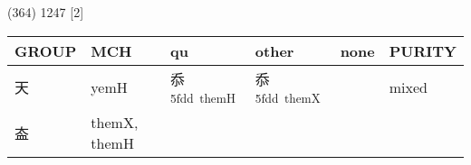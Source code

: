 \documentclass[14pt,a4paper]{scrartcl}
\begin{document}
(364) 1247 {[}2{]}

\begin{longtable}[c]{@{}llllll@{}}
\toprule
\begin{minipage}[b]{0.14\columnwidth}\raggedright\strut
GROUP
\strut\end{minipage} &
\begin{minipage}[b]{0.14\columnwidth}\raggedright\strut
MCH
\strut\end{minipage} &
\begin{minipage}[b]{0.14\columnwidth}\raggedright\strut
qu
\strut\end{minipage} &
\begin{minipage}[b]{0.14\columnwidth}\raggedright\strut
other
\strut\end{minipage} &
\begin{minipage}[b]{0.14\columnwidth}\raggedright\strut
none
\strut\end{minipage} &
\begin{minipage}[b]{0.14\columnwidth}\raggedright\strut
PURITY
\strut\end{minipage}\tabularnewline
\midrule
\endhead
\begin{minipage}[t]{0.14\columnwidth}\raggedright\strut
天
\strut\end{minipage} &
\begin{minipage}[t]{0.14\columnwidth}\raggedright\strut
yemH
\strut\end{minipage} &
\begin{minipage}[t]{0.14\columnwidth}\raggedright\strut
忝\textsuperscript{5fdd~themH}
\strut\end{minipage} &
\begin{minipage}[t]{0.14\columnwidth}\raggedright\strut
忝\textsuperscript{5fdd~themX}
\strut\end{minipage} &
\begin{minipage}[t]{0.14\columnwidth}\raggedright\strut
\strut\end{minipage} &
\begin{minipage}[t]{0.14\columnwidth}\raggedright\strut
mixed
\strut\end{minipage}\tabularnewline
\begin{minipage}[t]{0.14\columnwidth}\raggedright\strut
盇
\strut\end{minipage} &
\begin{minipage}[t]{0.14\columnwidth}\raggedright\strut
themX, themH
\strut\end{minipage} &
\begin{minipage}[t]{0.14\columnwidth}\raggedright\strut

\end{minipage}
\end{longtable}
\end{document}
